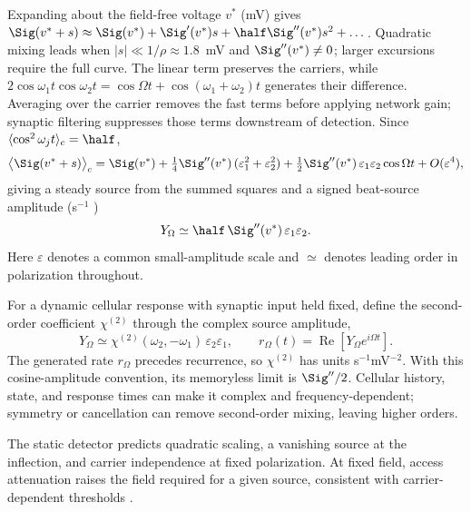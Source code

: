 Expanding about the field-free voltage $v^*$ (mV)
\cite{ruffini2025ham} gives
$\Sig(v^*+s)\approx\Sig(v^*)+\Sig'(v^*)s+\half\Sig''(v^*)s^2+\dots$.
Quadratic mixing leads when $|s|\ll1/\rho\approx1.8$~mV and
$\Sig''(v^*)\ne0$; larger excursions require the full curve.
The linear term preserves the carriers, while
$2\cos\omega_1t\cos\omega_2t=\cos\Omega t+\cos(\omega_1+\omega_2)t$
generates their difference. Averaging over the carrier removes the fast terms
before applying network gain; synaptic filtering suppresses those terms
downstream of detection. Since $\langle\cos^2\omega_jt\rangle_c=\half$,
\begin{equation}
\big\langle\Sig(v^*+s)\big\rangle_c
=\Sig(v^*)+\tfrac14\Sig''(v^*)\,(\varepsilon_1^2+\varepsilon_2^2)
+\tfrac12\Sig''(v^*)\,\varepsilon_1\varepsilon_2\cos\Omega t+O(\varepsilon^4),
\label{eq:taylor}
\end{equation}
giving a steady source from the summed squares and a signed beat-source amplitude (s$^{-1}$ )
\begin{equation}
Y_\Omega\simeq\half\,\Sig''(v^*)\,\varepsilon_1\varepsilon_2 .
\label{eq:demod}
\end{equation}
Here $\varepsilon$ denotes a common small-amplitude scale and $\simeq$
denotes leading order in polarization throughout.

For a dynamic cellular response with synaptic input held fixed, define
the second-order coefficient $\chi^{(2)}$ through the complex source amplitude,
\begin{equation}
Y_\Omega\simeq\chi^{(2)}(\omega_2,-\omega_1)\,
\varepsilon_2\varepsilon_1,\qquad
r_\Omega(t)=\operatorname{Re}\!\left[Y_\Omega e^{i\Omega t}\right].
\label{eq:chi2}
\end{equation}
The generated rate $r_\Omega$ precedes recurrence, so $\chi^{(2)}$ has units
s$^{-1}$mV$^{-2}$. With this cosine-amplitude convention, its memoryless
limit is $\Sig''/2$. Cellular history, state, and response times can make
it complex and frequency-dependent; symmetry or cancellation can remove
second-order mixing, leaving higher orders.

The static detector predicts quadratic scaling, a vanishing source at the
inflection, and carrier independence at fixed polarization. At fixed field,
access attenuation raises the field required for a given source, consistent
with carrier-dependent thresholds \cite{opancar2025,peripheral2023}.

